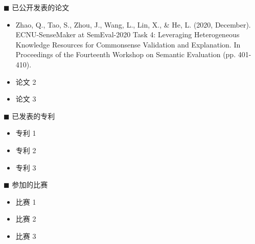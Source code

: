 \newpage
\begin{center}
  \large\bfseries{}
\end{center}
\vskip 5mm

  {\heiti $\blacksquare$ 已公开发表的论文}\vskip 5mm

\begin{itemize}
  \item
  Zhao, Q., Tao, S., Zhou, J., Wang, L., Lin, X., \& He, L. (2020, December). 
  ECNU-SenseMaker at SemEval-2020 Task 4: Leveraging Heterogeneous Knowledge Resources for Commonsense Validation and Explanation. In Proceedings of the Fourteenth Workshop on Semantic Evaluation (pp. 401-410).
  \item 论文 2
  \item 论文 3
\end{itemize}

\bigskip\bigskip

{\heiti $\blacksquare$ 已发表的专利}\vskip 5mm

\begin{itemize}
  \item 专利 1
  \item 专利 2
  \item 专利 3
\end{itemize}

\bigskip\bigskip

{\heiti $\blacksquare$ 参加的比赛}\vskip 5mm

\begin{itemize}
  \item 比赛 1
  \item 比赛 2
  \item 比赛 3
\end{itemize}